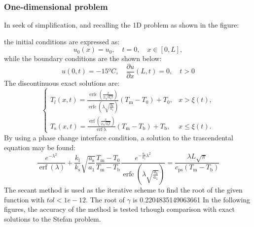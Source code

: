 \subsubsection*{One-dimensional problem}
In seek of simplification, and recalling the 1D problem as shown in the figure:

the initial conditions are expressed as:
\begin{equation}
	u_{0}(x)=u_{0}, \quad t=0, \quad x \in[0, L],
	\label{3.38}
\end{equation}
while the boundary conditions are the shown below:
\begin{equation}
u(0, t)=-15ºC, \quad \frac{\partial u}{\partial x}(L, t)=0, \quad t>0
\label{3.39}
\end{equation}
The discontinuous exact solutions are:
\begin{equation}
	\begin{cases}T_{l}(x, t)=\frac{\operatorname{erfc}\left(\frac{x}{2 \sqrt{a_{1} t}}\right)}{\operatorname{erfc}\left(\lambda \sqrt{\frac{a_{\mathrm{s}}}{a_{1}}}\right)}\left(T_{\mathrm{m}}-T_{0}\right)+T_{0}, & x>\xi(t), \\ 
	T_{\mathrm{s}}(x, t)=\frac{\operatorname{erf}\left(\frac{x}{2 \sqrt{a_{\mathrm{s}} t}}\right)}{\operatorname{erf \cdot\lambda }}\left(T_{\mathrm{m}}-T_{\mathrm{b}}\right)+T_{\mathrm{b}},& x \leq \xi(t)  .\end{cases}
	\label{3.40}
\end{equation}
By using a phase change interface condition, a solution to the trascendental equation may be found:
\begin{equation}
	\frac{e^{-\lambda^{2}}}{\operatorname{erf}(\lambda)}+\frac{k_{\mathrm{l}}}{k_{\mathrm{s}}} \sqrt{\frac{a_{\mathrm{s}}}{a_{1}}} \frac{T_{\mathrm{m}}-T_{0}}{T_{\mathrm{m}}-T_{\mathrm{b}}} \frac{e^{-\frac{a_{\mathrm{s}}}{a_{1}} \lambda^{2}}}{\operatorname{erfc}\left(\lambda \sqrt{\frac{a_{\mathrm{s}}}{a_{1}}}\right)}=\frac{\lambda L \sqrt{\pi}}{c_{\mathrm{ps}}\left(T_{\mathrm{m}}-T_{\mathrm{b}}\right)}
	\label{3.41}
\end{equation}
The secant method is used as the iterative scheme to find the root of the given function with $tol<1e-12$. The root of $\gamma$ is 0.2204835149063661
In the following figures, the accuracy of the method is tested trhough comparison with exact solutions to the Stefan problem.

